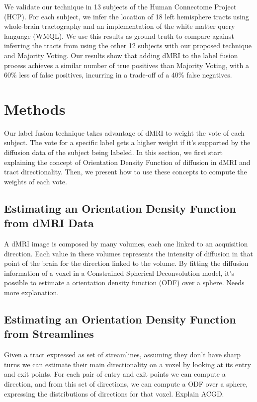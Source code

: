 We validate our technique in 13 subjects of the Human Connectome Project (HCP).
For each subject, we infer the location of 18 left hemisphere tracts using
whole-brain tractography and an implementation of the white matter query language
(WMQL). We use this results as ground truth to compare against inferring the
tracts from using the other 12 subjects with our proposed technique and Majority
Voting. Our results show that adding dMRI to the label fusion process achieves a
similar number of true positives than Majority Voting, with a 60\% less of
false positives, incurring in a trade-off of a 40\% false negatives.

\section{Methods}

Our label fusion technique takes advantage of dMRI to weight the vote of each
subject. The vote for a specific label gets a higher weight if it's supported
by the diffusion data of the subject being labeled. In this section, we first
start explaining the concept of Orientation Density Function of diffusion in
dMRI and tract directionality. Then, we present how to use these concepts to
compute the weights of each vote.

\subsection{Estimating an Orientation Density Function from dMRI Data}
A dMRI image is composed by many volumes, each one linked to an acquisition
direction. Each value in these volumes represents the intensity of diffusion
in that point of the brain for the direction linked to the volume. By fitting
the diffusion information of a voxel in a Constrained Spherical Deconvolution
model, it's possible to estimate a orientation density function (ODF) over a
sphere. Needs more explanation.

\subsection{Estimating an Orientation Density Function from Streamlines}
Given a tract expressed as set of streamlines, assuming they don't have sharp
turns we can estimate their main directionality on a voxel by looking at its
entry and exit points. For each pair of entry and exit points we can compute a
direction, and from this set of directions, we can compute a ODF over a sphere,
expressing the distributions of directions for that voxel. Explain ACGD.

